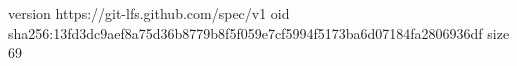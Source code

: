 version https://git-lfs.github.com/spec/v1
oid sha256:13fd3dc9aef8a75d36b8779b8f5f059e7cf5994f5173ba6d07184fa2806936df
size 69
